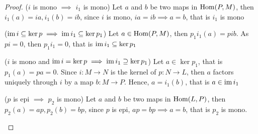 \begin{proof} 
	
	($i$ is mono $\implies$ $i_1$ is mono) Let $a$ and $b$ be two maps in $\operatorname{Hom}(P, M)$, then $i_1(a) = ia, i_1(b) = ib$, since $i$ is mono, $ia = ib \implies a = b$, that is $i_1$ is mono
	
	\begin{center}
	\end{center}
	
	($\operatorname{im} i \subseteq \ker p \implies \operatorname{im} i_1 \subseteq \ker p_1$) Let $a \in \operatorname{Hom}(P, M)$, then $p_1 i_1 (a) = pib$. As $pi = 0$, then $p_1 i_1 = 0$, that is $\operatorname{im} i_1 \subseteq \ker p_1$
	\begin{center}
	\end{center}
	
	($i$ is mono and $\operatorname{im} i = \ker p \implies \operatorname{im} i_1 \supseteq \ker p_1$) Let $a \in \ker p_1$, that is $p_1(a) = pa = 0$. Since $i: M \to N$ is the kernel of $p: N \to L$, then $a$ factors uniquely through $i$ by a map $b: M \to P$. Hence, $a = i_1(b)$, that is $a \in \operatorname{im} i_1$
	\begin{center}
	\end{center}
	
	($p$ is epi $\implies$ $p_2$ is mono) Let $a$ and $b$ be two maps in $\operatorname{Hom}(L, P)$, then $p_2(a) = ap, p_2(b) = bp$, since $p$ is epi, $ap = bp \implies a = b$, that is $p_2$ is mono.
	\begin{center}
	\end{center}
	

\end{proof}
